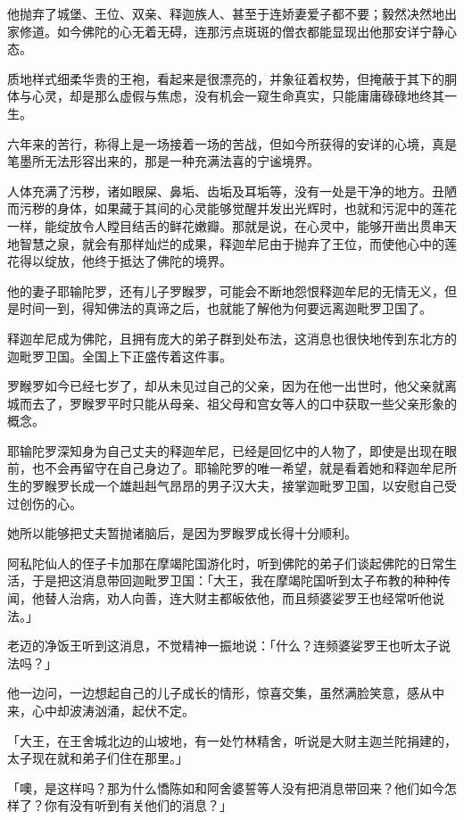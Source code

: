 \documentclass[12pt,twoside,openany]{book}
\begin{document}
他抛弃了城堡、王位、双亲、释迦族人、甚至于连娇妻爱子都不要；毅然决然地出家修道。如今佛陀的心无着无碍，连那污点斑斑的僧衣都能显现出他那安详宁静心态。

质地样式细柔华贵的王袍，看起来是很漂亮的，并象征着权势，但掩蔽于其下的胴体与心灵，却是那么虚假与焦虑，没有机会一窥生命真实，只能庸庸碌碌地终其一生。

六年来的苦行，称得上是一场接着一场的苦战，但如今所获得的安详的心境，真是笔墨所无法形容出来的，那是一种充满法喜的宁谧境界。

人体充满了污秽，诸如眼屎、鼻垢、齿垢及耳垢等，没有一处是干净的地方。丑陋而污秽的身体，如果藏于其间的心灵能够觉醒并发出光辉时，也就和污泥中的莲花一样，能绽放令人瞠目结舌的鲜花嫩瓣。那就是说，在心灵中，能够开凿出贯串天地智慧之泉，就会有那样灿烂的成果，释迦牟尼由于抛弃了王位，而使他心中的莲花得以绽放，他终于抵达了佛陀的境界。

他的妻子耶输陀罗，还有儿子罗睺罗，可能会不断地怨恨释迦牟尼的无情无义，但是时间一到，得知佛法的真谛之后，也就能了解他为何要远离迦毗罗卫国了。

释迦牟尼成为佛陀，且拥有庞大的弟子群到处布法，这消息也很快地传到东北方的迦毗罗卫国。全国上下正盛传着这件事。

罗睺罗如今已经七岁了，却从未见过自己的父亲，因为在他一出世时，他父亲就离城而去了，罗睺罗平时只能从母亲、祖父母和宫女等人的口中获取一些父亲形象的概念。

耶输陀罗深知身为自己丈夫的释迦牟尼，已经是回忆中的人物了，即使是出现在眼前，也不会再留守在自己身边了。耶输陀罗的唯一希望，就是看着她和释迦牟尼所生的罗睺罗长成一个雄赳赳气昂昂的男子汉大夫，接掌迦毗罗卫国，以安慰自己受过创伤的心。

她所以能够把丈夫暂抛诸脑后，是因为罗睺罗成长得十分顺利。

阿私陀仙人的侄子卡加那在摩竭陀国游化时，听到佛陀的弟子们谈起佛陀的日常生活，于是把这消息带回迦毗罗卫国：「大王，我在摩竭陀国听到太子布教的种种传闻，他替人治病，劝人向善，连大财主都皈依他，而且频婆娑罗王也经常听他说法。」

老迈的净饭王听到这消息，不觉精神一振地说：「什么？连频婆娑罗王也听太子说法吗？」

他一边问，一边想起自己的儿子成长的情形，惊喜交集，虽然满脸笑意，感从中来，心中却波涛汹涌，起伏不定。

「大王，在王舍城北边的山坡地，有一处竹林精舍，听说是大财主迦兰陀捐建的，太子现在就和弟子们住在那里。」

「噢，是这样吗？那为什么憍陈如和阿舍婆誓等人没有把消息带回来？他们如今怎样了？你有没有听到有关他们的消息？」
\end{document}
